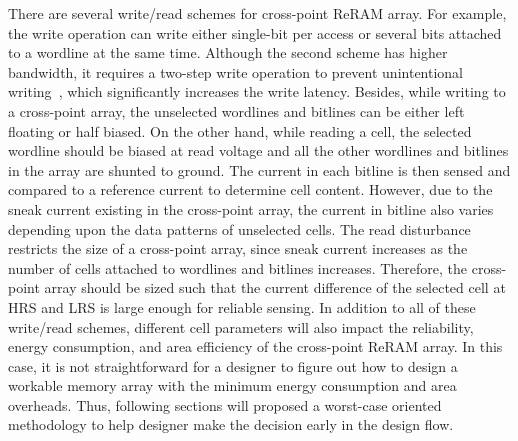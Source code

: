 There are several write/read schemes for cross-point ReRAM array. For
example, the write operation can write either single-bit per access or
several bits attached to a wordline at the same time. Although the second
scheme has higher bandwidth, it requires a two-step write operation to
prevent unintentional writing~\cite{memristor:Cong}, which significantly
increases the write latency.
Besides, while writing to a cross-point array, the unselected wordlines
and bitlines can be either left floating or half biased. On the other
hand, while reading a cell, the selected wordline should be biased at read
voltage and all the other wordlines and bitlines in the array are shunted
to ground. The current in each bitline is then sensed and compared to a
reference current to determine cell content. However, due to the sneak
current existing in the cross-point array, the current in bitline also
varies depending upon the data patterns of unselected cells.
The read disturbance restricts the size of a cross-point array, since
sneak current increases as the number of cells attached to wordlines and
bitlines increases. Therefore, the cross-point array should be sized such
that the current difference of the selected cell at HRS and LRS is large
enough for reliable sensing. In addition to all of these write/read
schemes, different cell parameters will also impact the reliability,
energy consumption, and area efficiency of the cross-point ReRAM array. In
this case, it is not straightforward for a designer to figure out how to
design a workable memory array with the minimum energy consumption and
area overheads. Thus, following sections will proposed a worst-case
oriented methodology to help designer make the decision early in the
design flow.



